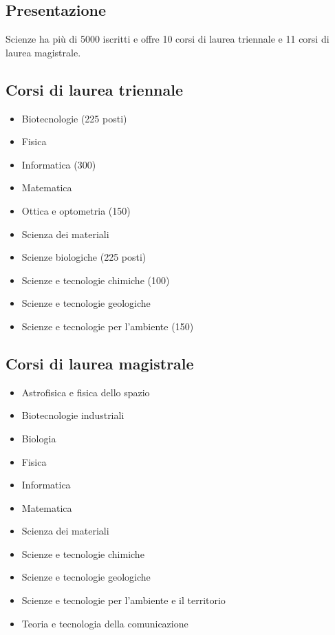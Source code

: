 
\subsection{Presentazione}
Scienze ha più di 5000 iscritti e offre 10 corsi di laurea triennale e 11 corsi di laurea magistrale.

\subsection{Corsi di laurea triennale}
\begin{itemize}
\item Biotecnologie (225 posti) 
\item Fisica 
\item Informatica (300)
\item Matematica 
\item Ottica e optometria (150) 
\item Scienza dei materiali 
\item Scienze biologiche (225 posti) 
\item Scienze e tecnologie chimiche (100) 
\item Scienze e tecnologie geologiche 
\item Scienze e tecnologie per l'ambiente (150)
\end{itemize}

\subsection{Corsi di laurea magistrale}
\begin{itemize}
\item Astrofisica e fisica dello spazio 
\item Biotecnologie industriali
\item Biologia
\item Fisica
\item Informatica
\item Matematica
\item Scienza dei materiali 
\item Scienze e tecnologie chimiche 
\item Scienze e tecnologie geologiche
\item Scienze e tecnologie per l'ambiente e il territorio 
\item Teoria e tecnologia della comunicazione
\end{itemize}

